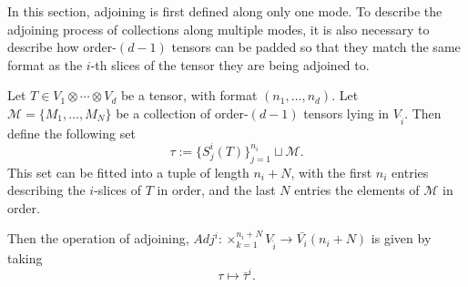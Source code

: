 \documentclass[../Lael_John_MasterThesis_Draft.tex]{subfiles}
\begin{document}
In this section, adjoining is first defined along only one mode. To describe the adjoining process of collections along multiple modes, it is also necessary to describe how order-$(d-1)$ tensors can be padded so that they match the same format as the $i$-th slices of the tensor they are being adjoined to.

\begin{definition}\label{defn:adjoiningslicesinglemode}
    Let $T \in V_1 \otimes \cdots \otimes V_d$ be a tensor, with format $(n_1, \ldots, n_d)$. Let $\mathcal{M} = \{M_1, \ldots, M_N\}$ be a collection of order-$(d-1)$ tensors lying in $V_{\hat{i}}$. Then define the following set $$\tau := \{S^i_j(T)\}_{j=1}^{n_i} \sqcup \mathcal{M}.$$ This set can be fitted into a tuple of length $n_i + N$, with the first $n_i$ entries describing the $i$-slices of $T$ in order, and the last $N$ entries the elements of $\mathcal{M}$ in order.

    Then the operation of adjoining, $Adj^i: \times_{k=1}^{n_i + N} V_{\hat{i}} \to \bar{V_i}(n_i + N)$ is given by taking $$\tau \mapsto \bar{\tau}^i.$$
\end{definition}
\end{document}

